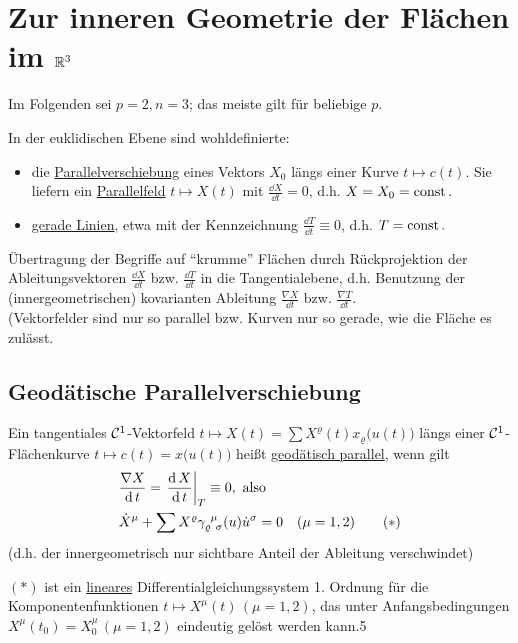 \section{Zur inneren Geometrie der Flächen im $\mathbb{R}^3$}
Im Folgenden sei \(p = 2, n = 3\); das meiste gilt für beliebige \(p\). \par
In der euklidischen Ebene sind wohldefinierte:
\begin{itemize}
 \item die \uline{Parallelverschiebung} eines Vektors \(X_0\) längs einer Kurve \(t \mapsto c(t)\). Sie liefern ein \uline{Parallelfeld} \(t \mapsto X(t)\) mit \(\frac{\dd X}{\dd t} = 0\), d.h. \(X = X_0 = \operatorname{const}.\)
 \item \uline{gerade Linien}, etwa mit der Kennzeichnung \(\frac{\dd T}{\dd t} \equiv 0\), d.h. \(T = \operatorname{const}.\)
\end{itemize}
Übertragung der Begriffe auf ``krumme'' Flächen durch Rückprojektion der Ableitungsvektoren \(\frac{\dd X}{\dd t}\) bzw. \(\frac{\dd T}{\dd t}\) in die Tangentialebene, d.h. Benutzung der (innergeometrischen) kovarianten Ableitung \(\frac{\nabla X}{\dd t}\) bzw. \(\frac{\nabla T}{\dd t}\). \\
(Vektorfelder sind nur so parallel bzw. Kurven nur so gerade, wie die Fläche es zulässt.

\subsection{Geodätische Parallelverschiebung}
\Rechts
\begin{definition}
 Ein tangentiales \(\mathcal{C}^1\)-Vektorfeld \(t \mapsto X(t) = \sum X^\varrho (t) x_\varrho \big(u(t)\big)\) längs einer \(\mathcal{C}^1\)-Flächenkurve \(t \mapsto c(t) = x\big(u(t)\big)\) heißt \uline{geodätisch parallel}, wenn gilt
 \begin{align*}
  &\frac{\nabla X}{\operatorname{d} t} = \left.\frac{\operatorname{d} X}{\operatorname{d} t}\right|_T \equiv 0, \text{ also} \\
  &\dot X^\mu + \sum X^\varrho \gamma_{\varrho \;\, \sigma}^{\;\, \mu} (u) \dot u^\sigma = 0 \quad (\mu = 1,2) \tag{\(\ast\)}
 \end{align*}
(d.h. der innergeometrisch nur sichtbare Anteil der Ableitung verschwindet) \par
\((\ast)\) ist ein \uline{lineares} Differentialgleichungssystem 1. Ordnung für die Komponentenfunktionen \(t \mapsto X^\mu (t)\, (\mu = 1,2)\), das unter Anfangsbedingungen \(X^\mu(t_0) = X_0^\mu\, (\mu = 1,2)\) eindeutig gelöst werden kann.5
\end{definition}

